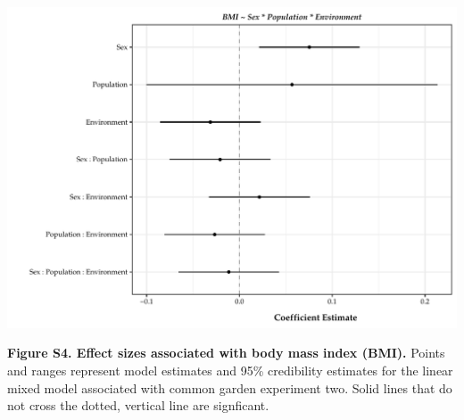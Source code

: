 \documentclass[]{article}
\begin{document}
\newpage

\includegraphics{../results/figures/RXNs_BMI_Model.pdf}

\textbf{Figure S4. Effect sizes associated with body mass index (BMI).}
Points and ranges represent model estimates and 95\% credibility
estimates for the linear mixed model associated with common garden
experiment two. Solid lines that do not cross the dotted, vertical line
are signficant.
\end{document}
